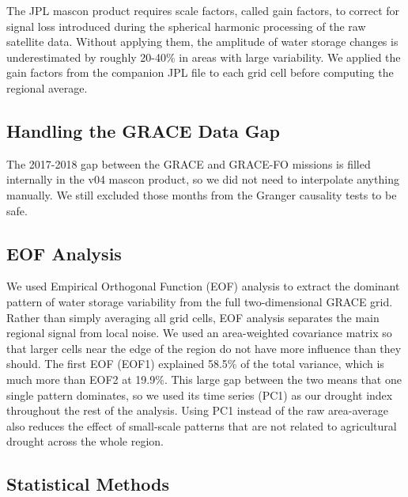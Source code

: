 \documentclass[6pt, twocolumn]{article}
\begin{document}
The JPL mascon product \cite{watkins2015improved} requires scale factors, called gain factors,
to correct for signal loss introduced during the spherical harmonic
processing of the raw satellite data. Without applying them, the
amplitude of water storage changes is underestimated by roughly
20-40\% in areas with large variability. We applied the gain factors
from the companion JPL file to each grid cell before computing the
regional average.

\subsection{Handling the GRACE Data Gap}

The 2017-2018 gap between the GRACE and GRACE-FO missions is filled
internally in the v04 mascon product, so we did not need to
interpolate anything manually. We still excluded those months from
the Granger causality tests to be safe.

\subsection{EOF Analysis}

We used Empirical Orthogonal Function (EOF) analysis to extract
the dominant pattern of water storage variability from the full
two-dimensional GRACE grid. Rather than simply averaging all grid
cells, EOF analysis separates the main regional signal from local
noise. We used an area-weighted covariance matrix so that larger
cells near the edge of the region do not have more influence than
they should. The first EOF (EOF1) explained 58.5\% of the
total variance, which is much more than EOF2 at 19.9\%. This large
gap between the two means that one single pattern dominates, so we
used its time series (PC1) as our drought index throughout the rest
of the analysis. Using PC1 instead of the raw area-average also
reduces the effect of small-scale patterns that are not related to
agricultural drought across the whole region.

\subsection{Statistical Methods}
\end{document}
